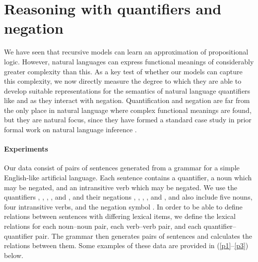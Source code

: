 \section{Reasoning with quantifiers and negation}\label{sec:quantifiers}

We have seen that recursive models can learn an approximation of propositional
logic.  However, natural languages can express functional meanings of
considerably greater complexity than this.  As a key test of whether our models 
can capture this complexity, we now directly measure the degree to which they are able to
develop suitable representations for the semantics of natural language
quantifiers like  and  as they interact with negation. Quantification 
and negation are far from the only place in natural language where complex functional meanings
are found, but they are natural focus, since they have
formed a standard case study in prior formal work on natural
language inference \cite{Icard:Moss:2013:LILT}.

\paragraph{Experiments}
Our data consist of pairs of sentences generated
from a grammar for a simple English-like artificial language.
Each sentence contains a quantifier, a noun
which may be negated, and an intransitive verb which may be
negated. We use the quantifiers , , ,
, and , and their negations , ,
, , and , and also
include five nouns, four intransitive verbs, and the negation symbol
. In order to be able to define relations between sentences
with differing lexical items, we define the lexical relations for
each noun--noun pair, each verb--verb pair, and each
quantifier--quantifier pair. The grammar then generates pairs of
sentences and calculates the relations
between them.  
Some examples of these data are provided in (\ref{p1}--\ref{p3}) below.




